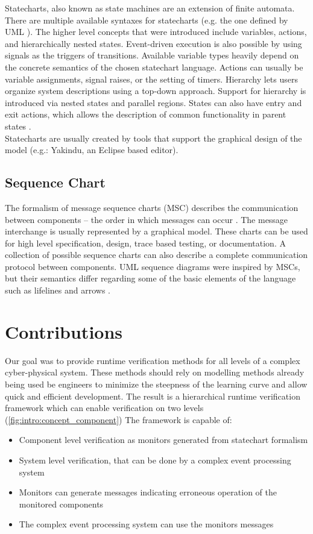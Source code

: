 Statecharts, also known as state machines are an extension of finite automata. There are multiple available syntaxes for statecharts (e.g. the one defined by UML \citep{stcuml}). The higher level concepts that were introduced include variables, actions, and hierarchically nested states. Event-driven execution is also possible by using signals as the triggers of transitions. Available variable types heavily depend on the concrete semantics of the chosen statechart language. Actions can usually be variable assignments, signal raises, or the setting of timers. Hierarchy lets users organize system descriptions using a top-down approach. Support for hierarchy is introduced via nested states and parallel regions. States can also have entry and exit actions, which allows the description of common functionality in parent states \citep{stcmove}.\\
Statecharts are usually created by tools that support the graphical design of the model (e.g.: Yakindu, an Eclipse based editor).


\subsection{Sequence Chart}

The formalism of message sequence charts (MSC) describes the communication between components -- the order in which messages can occur \citep{msc} \citep{msc2}. The message interchange is usually represented by a graphical model. These charts can be used for high level specification, design, trace based testing, or documentation. A collection of possible sequence charts can also describe a complete communication protocol between components. UML sequence diagrams were inspired by MSCs, but their semantics differ regarding some of the basic elements of the language such as lifelines and arrows \citep{mscuml}.

\section{Contributions}

Our goal was to provide runtime verification methods for all levels of a complex cyber-physical system. These methods should rely on modelling methods already being used be engineers to minimize the steepness of the learning curve and allow quick and efficient development. The result is a hierarchical runtime verification framework which can enable verification on two levels (\cref{fig:intro:concept_component}) The framework is capable of:
\begin{itemize}
  \item Component level verification as monitors generated from statechart formalism
  \item System level verification, that can be done by a complex event processing system
  \item Monitors can generate messages indicating erroneous operation of the monitored components
  \item The complex event processing system can use the monitors messages
\end{itemize}

